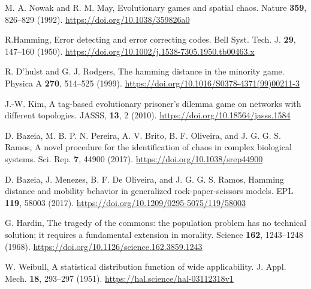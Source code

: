  




\begin{thebibliography}{04}



M. A. Nowak and R. M. May,
Evolutionary games and spatial chaos. 
Nature \textbf{359}, 826--829 (1992).
\url{https://doi.org/10.1038/359826a0}

\raggedright
R.Hamming,
Error detecting and error correcting codes.
Bell Syst. Tech. J. \textbf{29}, 147--160 
(1950).
\url{https://doi.org/10.1002/j.1538-7305.1950.tb00463.x}


\raggedright
R. D'hulst and G. J. Rodgers,
The hamming distance in the minority game.
Physica A \textbf{270}, 514--525 (1999). 
\url{https://doi.org/10.1016/S0378-4371(99)00211-3}

\raggedright
J.-W. Kim,
A tag-based evolutionary prisoner's dilemma game on networks with different topologies.
JASSS, \textbf{13}, 2 (2010).
\url{https://doi.org/10.18564/jasss.1584}

\raggedright
D. Bazeia, M. B. P. N. Pereira, A. V. Brito, B. F. Oliveira, and J. G. G. S. Ramos,
A novel procedure for the identification of chaos in complex biological systems.
Sci. Rep. \textbf{7}, 44900 (2017).
\url{https://doi.org/10.1038/srep44900}

\raggedright
D. Bazeia, J. Menezes, B. F. De Oliveira, and J. G. G. S. Ramos,
Hamming distance and mobility behavior in generalized rock-paper-scissors models.
EPL \textbf{119}, 58003 (2017).
\url{https://doi.org/10.1209/0295-5075/119/58003}

\raggedright
G. Hardin,
The tragedy of the commons: the population problem has no technical solution; it requires a fundamental extension in morality.
Science \textbf{162}, 1243--1248 (1968).
\url{https://doi.org/10.1126/science.162.3859.1243}


\raggedright
W. Weibull, A statistical distribution function of wide applicability.
J. Appl. Mech. \textbf{18}, 293--297 (1951).
\url{https://hal.science/hal-03112318v1}
\end{thebibliography}
